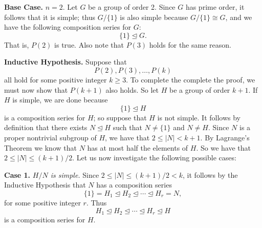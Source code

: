 \documentclass[9pt]{article}
\begin{document}
\begin{enumerate}
      \textbf{Base Case.} $n = 2$. Let $G$ be a group of order 2. Since $G$ has
      prime order, it follows that it is simple; thus $G/\{1\}$ is also simple
      because $G/\{1\} \cong G$, and we have the following composition series
      for $G$:
      $$\{1\} \trianglelefteq G.$$
      That is, $P(2)$ is true. Also note that $P(3)$ holds for the same reason.
      
      \textbf{Inductive Hypothesis.} Suppose that
      $$P(2), P(3), \ldots, P(k)$$
      all hold for some positive integer $k \ge 3$. To complete the complete the
      proof, we must now show that $P(k + 1)$ also holds. So let $H$ be a group
      of order $k + 1$. If $H$ is simple, we are done because
      $$\{1\} \trianglelefteq H$$
      is a composition series for $H$; so suppose that $H$ is not simple. It
      follows by definition that there exists $N \trianglelefteq H$ such that
      $N \neq \{1\}$ and $N \neq H$. Since $N$ is a proper nontrivial subgroup
      of $H$, we have that $2 \le |N| < k + 1$. By Lagrange's Theorem we know
      that $N$ has at most half the elements of $H$. So we have that
      $2 \le |N| \le  (k+1)/2$. Let us now investigate the following possible
      cases:
      
      \textbf{Case 1.} \textit{$H/N$ is simple.} Since
      $2 \le |N| \le  (k+1)/2 < k$, it follows by the Inductive Hypothesis that 
      $N$ has a composition series
      $$\{1\} = H_1 \trianglelefteq H_2 \trianglelefteq \cdots \trianglelefteq
        H_r = N,$$
      for some positive integer $r$. Thus
      $$H_1 \trianglelefteq H_2 \trianglelefteq \cdots \trianglelefteq
        H_r \trianglelefteq H$$
      is a composition series for $H$.
      

\end{enumerate}
\end{document}
